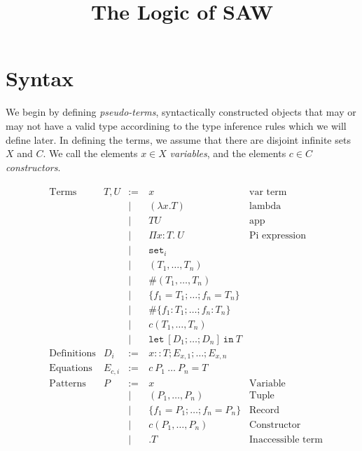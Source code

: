 \documentclass{article}
\title{The Logic of SAW}
\newcommand{\fn}[1]{\mathtt{#1}}
\newcommand{\set}[1]{\fn{set}_{#1}}
\newcommand{\Piexpr}[3]{\Pi {#1}{:}{#2}.\ {#3}}
\begin{document}

\section{Syntax}

We begin by defining \emph{pseudo-terms}, syntactically constructed objects that
may or may not have a valid type accordining to the type inference rules which we
will define later.  In defining the terms, we assume that there are disjoint infinite
sets $X$ and $C$.  We call the elements $x \in X$ \emph{variables}, and the elements
$c \in C$ \emph{constructors}.

\begin{align*}
&\begin{array}{llrll}
\text{Terms}
& T,U    &:=\:& x & \text{var term}\\
&        & |\:& (\lambda x . T) &\text{lambda}\\
&        & |\:& T U &\text{app}\\
&        & |\:& \Piexpr{x}{T}{U} &\text{Pi expression}\\
&        & |\:& \set{i}\\
&        & |\:& (T_1, \dots, T_n)\\ %
&        & |\:& \#(T_1, \dots, T_n)\\ %
&        & |\:& \{ f_1 = T_1; \dots; f_n = T_n \} \\ %
&        & |\:& \#\{ f_1 : T_1; \dots; f_n : T_n \} \\ %
&        & |\:& c(T_1,\dots,T_n)\\ %
&        & |\:& \fn{let}\ [ D_1; \dots; D_n ]\ \fn{in}\ T\\ %
\text{Definitions}
&D_i     &:=\:&x :: T; E_{x,1}; \dots; E_{x,n}\\
\text{Equations}
&E_{c,i} &:=\:&c\ P_1\ \dots\ P_n = T\\
\text{Patterns}
&P       &:=\:&x & \text{Variable}\\
&        & |\:&(P_1, \dots, P_n) &\text{Tuple}\\ %
&        & |\:&\{ f_1 = P_1; \dots; f_n = P_n \} & \text{Record}\\ %
&        & |\:&c(P_1, \dots, P_n) & \text{Constructor}\\ %
&        & |\:&.T & \text{Inaccessible term}\\
\end{array}\\
\end{align*}
\end{document}
